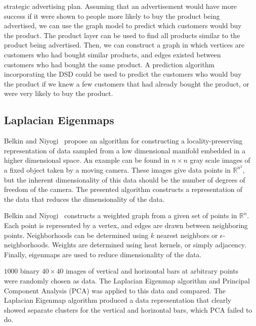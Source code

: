 strategic advertising plan. Assuming that an advertisement would have more success if it were shown
to people more likely to buy the product being advertised, we can use the graph model to predict
which customers would buy the product. The product layer can be used to find all products similar to
the product being advertised. Then, we can construct a graph in which vertices are customers who had
bought similar products, and edges existed between customers who had bought the same product. A
prediction algorithm incorporating the DSD could be used to predict the customers who would buy the
product if we knew a few customers that had already bought the product, or were very likely to buy
the product.


\subsection{Laplacian Eigenmaps} Belkin and Niyogi~\cite{belkin2002laplacian} propose an algorithm
for constructing a locality-preserving representation of data sampled from a low dimensional
manifold embedded in a higher dimensional space. An example can be found in $n\times n$ gray scale
images of a fixed object taken by a moving camera. These images give data points in
$\mathbb{R}^{n^{2}}$, but the inherent dimensionality of this data should be the number of degrees
of freedom of the camera. The presented algorithm constructs a representation of the data that
reduces the dimensionality of the data.

Belkin and Niyogi~\cite{belkin2002laplacian} constructs a weighted graph from a given set of points
in $\mathbb{R}^{n}$. Each point is represented by a vertex, and edges are drawn between neighboring
points. Neighborhoods can be determined using $k$ nearest neighbors or $\epsilon$-neighborhoods.
Weights are determined using heat kernels, or simply adjacency. Finally, eigenmaps are used to
reduce dimensionality of the data.

$1000$ binary $40 \times 40$ images of vertical and horizontal bars at arbitrary points were
randomly chosen as data. The Laplacian Eigenmap algorithm and Principal Component Analysis (PCA) was
applied to this data and compared. The Laplacian Eigenmap algorithm produced a data representation
that clearly showed separate clusters for the vertical and horizontal bars, which PCA failed to do.

